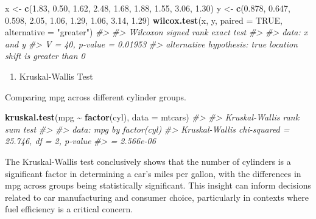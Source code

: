 \documentclass[
]{book}
\newenvironment{Shaded}{\begin{snugshade}}{\end{snugshade}}
\newcommand{\AttributeTok}[1]{\textcolor[rgb]{0.13,0.29,0.53}{#1}}
\newcommand{\CommentTok}[1]{\textcolor[rgb]{0.56,0.35,0.01}{\textit{#1}}}
\newcommand{\ConstantTok}[1]{\textcolor[rgb]{0.56,0.35,0.01}{#1}}
\newcommand{\FloatTok}[1]{\textcolor[rgb]{0.00,0.00,0.81}{#1}}
\newcommand{\FunctionTok}[1]{\textcolor[rgb]{0.13,0.29,0.53}{\textbf{#1}}}
\newcommand{\NormalTok}[1]{#1}
\newcommand{\OtherTok}[1]{\textcolor[rgb]{0.56,0.35,0.01}{#1}}
\newcommand{\SpecialCharTok}[1]{\textcolor[rgb]{0.81,0.36,0.00}{\textbf{#1}}}
\newcommand{\StringTok}[1]{\textcolor[rgb]{0.31,0.60,0.02}{#1}}
\providecommand{\tightlist}{%
  \setlength{\itemsep}{0pt}\setlength{\parskip}{0pt}}
\begin{document}
\begin{Shaded}
\begin{Highlighting}[]
\NormalTok{x }\OtherTok{\textless{}{-}} \FunctionTok{c}\NormalTok{(}\FloatTok{1.83}\NormalTok{,  }\FloatTok{0.50}\NormalTok{,  }\FloatTok{1.62}\NormalTok{,  }\FloatTok{2.48}\NormalTok{, }\FloatTok{1.68}\NormalTok{, }\FloatTok{1.88}\NormalTok{, }\FloatTok{1.55}\NormalTok{, }\FloatTok{3.06}\NormalTok{, }\FloatTok{1.30}\NormalTok{)}
\NormalTok{y }\OtherTok{\textless{}{-}} \FunctionTok{c}\NormalTok{(}\FloatTok{0.878}\NormalTok{, }\FloatTok{0.647}\NormalTok{, }\FloatTok{0.598}\NormalTok{, }\FloatTok{2.05}\NormalTok{, }\FloatTok{1.06}\NormalTok{, }\FloatTok{1.29}\NormalTok{, }\FloatTok{1.06}\NormalTok{, }\FloatTok{3.14}\NormalTok{, }\FloatTok{1.29}\NormalTok{)}
\FunctionTok{wilcox.test}\NormalTok{(x, y, }\AttributeTok{paired =} \ConstantTok{TRUE}\NormalTok{, }\AttributeTok{alternative =} \StringTok{"greater"}\NormalTok{)}
\CommentTok{\#\textgreater{} }
\CommentTok{\#\textgreater{}  Wilcoxon signed rank exact test}
\CommentTok{\#\textgreater{} }
\CommentTok{\#\textgreater{} data:  x and y}
\CommentTok{\#\textgreater{} V = 40, p{-}value = 0.01953}
\CommentTok{\#\textgreater{} alternative hypothesis: true location shift is greater than 0}
\end{Highlighting}
\end{Shaded}

\begin{enumerate}
\def\labelenumi{\alph{enumi}.}
\setcounter{enumi}{2}
\tightlist
\item
  Kruskal-Wallis Test
\end{enumerate}

Comparing mpg across different cylinder groups.

\begin{Shaded}
\begin{Highlighting}[]
\FunctionTok{kruskal.test}\NormalTok{(mpg }\SpecialCharTok{\textasciitilde{}} \FunctionTok{factor}\NormalTok{(cyl), }\AttributeTok{data =}\NormalTok{ mtcars)}
\CommentTok{\#\textgreater{} }
\CommentTok{\#\textgreater{}  Kruskal{-}Wallis rank sum test}
\CommentTok{\#\textgreater{} }
\CommentTok{\#\textgreater{} data:  mpg by factor(cyl)}
\CommentTok{\#\textgreater{} Kruskal{-}Wallis chi{-}squared = 25.746, df = 2, p{-}value}
\CommentTok{\#\textgreater{} = 2.566e{-}06}
\end{Highlighting}
\end{Shaded}

The Kruskal-Wallis test conclusively shows that the number of cylinders is a significant factor in determining a car's miles per gallon, with the differences in mpg across groups being statistically significant. This insight can inform decisions related to car manufacturing and consumer choice, particularly in contexts where fuel efficiency is a critical concern.
\end{document}
